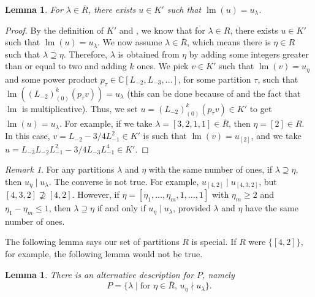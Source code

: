 \documentclass[a4paper, 12pt, reqno]{amsart}
\newtheorem{lemma}[theorem]{Lemma}
\theoremstyle{remark}
\newtheorem{remark}[theorem]{Remark}
\DeclareMathOperator{\lm}{lm}
\begin{document}
\begin{lemma}
  \label{lmm:37}
  For $\lambda \in \overline{R}$, there exists $u \in K'$ such that $\lm(u) = u_{\lambda}$.
\end{lemma}

\begin{proof}
  By the definition of $K'$ and \cite[Proposition 5.1]{andrews_singular_2022}, we know that for $\lambda \in R$, there exists $u \in K'$ such that $\lm(u) = u_{\lambda}$.
  We now assume $\lambda \in \overline{R}$, which means there is $\eta \in R$ such that $\lambda \supseteq \eta$.
  Therefore, $\lambda$ is obtained from $\eta$ by adding some integers greater than or equal to two and adding $k$ ones.
  We pick $v \in K'$ such that $\lm(v) = u_{\eta}$ and some power product $p_{\tau} \in \mathbb{C}[L_{-2}, L_{-3}, \dots]$, for some partition $\tau$, such that $\lm((L_{-2})^k_{(0)}(p_{\tau}v)) = u_{\lambda}$ (this can be done because of  and the fact that $\lm$ is multiplicative).
  Thus, we set $u = (L_{-2})^k_{(0)}(p_{\tau}v) \in K'$ to get $\lm(u) = u_{\lambda}$.
  For example, if we take $\lambda = [3, 2, 1, 1] \in \overline{R}$, then $\eta = [2] \in R$.
  In this case, $v = L_{-2}- 3/4L_{-1}^2 \in K'$ is such that $\lm(v) = u_{[2]}$, and we take $u = L_{-3}L_{-2}L_{-1}^2 - 3/4L_{-3}L_{-1}^4 \in K'$.
\end{proof}

\begin{remark}
  \label{rmk:52}
  For any partitions $\lambda$ and $\eta$ with the same number of ones, if $\lambda \supseteq \eta$, then $u_{\eta} \mid u_{\lambda}$.
  The converse is not true.
  For example, $u_{[4, 2]} \mid u_{[4, 3, 2]}$, but $[4, 3, 2] \nsupseteq [4, 2]$.
  However, if $\eta = [\eta_1, \dots, \eta_m, 1, \dots, 1]$ with $\eta_m \ge 2$ and $\eta_1 - \eta_m \le 1$, then $\lambda \supseteq \eta$ if and only if $u_{\eta} \mid u_{\lambda}$, provided $\lambda$ and $\eta$ have the same number of ones.
\end{remark}

The following lemma says our set of partitions $R$ is special.
If $R$ were $\{[4, 2]\}$, for example, the following lemma would not be true.

\begin{lemma}
  \label{lmm:38}
  There is an alternative description for $P$, namely
  \begin{equation*}
    P = \{\lambda \mid \text{for $\eta \in \overline{R}$, $u_{\eta} \nmid u_{\lambda}$}\}.
  \end{equation*}
\end{lemma}
\end{document}
